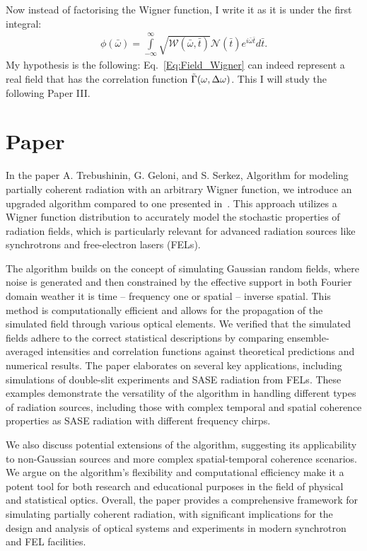     Now instead of factorising the Wigner function, I write it as it is under the first integral:
    \begin{align}
    	\phi(\bar{\omega}) = \int \limits_{-\infty}^{\infty} \sqrt{\mathcal{W}(\bar{\omega}, \bar{t})} \mathcal{N}(\bar{t}) e^{i \bar{\omega} \bar{t}} d\bar{t}.
    	\label{Eq:Field_Wigner}
    \end{align}
    My hypothesis is the following: Eq.~\ref{Eq:Field_Wigner} can indeed represent a real field that has the correlation function $\Tilde{\Gamma}(\omega, \Delta \omega)$. This I will study the following Paper III.
    
\newpage    
\setcounter{mycounter}{3} %
\section{Paper }
    
    In the paper A. Trebushinin, G. Geloni, and S. Serkez, Algorithm for modeling partially coherent radiation with an arbitrary Wigner function, we introduce an upgraded algorithm compared to one presented in~\cite{trebushinin_gaussian_2022}. This approach utilizes a Wigner function distribution to accurately model the stochastic properties of radiation fields, which is particularly relevant for advanced radiation sources like synchrotrons and free-electron lasers (FELs).
    
    The algorithm builds on the concept of simulating Gaussian random fields, where noise is generated and then constrained by the effective support in both Fourier domain weather it is time -- frequency one or spatial -- inverse spatial. This method is computationally efficient and allows for the propagation of the simulated field through various optical elements. We verified that the simulated fields adhere to the correct statistical descriptions by comparing ensemble-averaged intensities and correlation functions against theoretical predictions and numerical results. The paper elaborates on several key applications, including simulations of double-slit experiments and SASE radiation from FELs. These examples demonstrate the versatility of the algorithm in handling different types of radiation sources, including those with complex temporal and spatial coherence properties as SASE radiation with different frequency chirps.
    
    We also discuss potential extensions of the algorithm, suggesting its applicability to non-Gaussian sources and more complex spatial-temporal coherence scenarios. We argue on the algorithm's flexibility and computational efficiency make it a potent tool for both research and educational purposes in the field of physical and statistical optics. Overall, the paper provides a comprehensive framework for simulating partially coherent radiation, with significant implications for the design and analysis of optical systems and experiments in modern synchrotron and FEL facilities.
    
